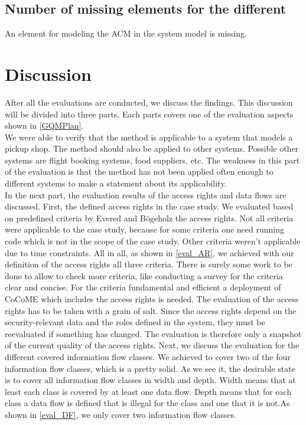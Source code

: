 \subsection{Number of missing elements for the different }
An element for modeling the ACM in the system model is missing.
\section{Discussion}
After all the evaluations are conducted, we discuss the findings. This discussion will be divided into three parts. Each parts covers one of the evaluation aspects shown in \autoref{GQMPlan}.\\
We were able to verify that the method is applicable to a system that models a pickup shop. The method should also be applied to other systems. Possible other systems are flight booking systems, food suppliers, etc. The weakness in this part of the evaluation is that the method has not been applied often enough to different systems to make a statement about its applicability.\\
In the next part, the evaluation results of the access rights and data flows are discussed. First, the defined access rights in the case study. We evaluated based on predefined criteria by Evered and Bögeholz \cite{CaseStudyAndAccessrigths} the access rights. Not all criteria were applicable to the case study, because for some criteria one need running code which is not in the scope of the case study. Other criteria weren't applicable due to time constraints. All in all, as shown in \autoref{eval_AR}, we achieved with our definition of the access rights all three criteria. There is surely some work to be done to allow to check more criteria, like conducting a survey for the criteria clear and concise. For the criteria fundamental and efficient a deployment of CoCoME which includes the access rights is needed. The evaluation of the access rights has to be taken with a grain of salt. Since the access rights depend on the security-relevant data and the roles defined in the system, they must be reevaluated if something has changed.  The evaluation is therefore only a snapshot of the current quality of the access rights. Next, we discuss the evaluation for the different covered information flow classes. We achieved to cover two of the four information flow classes, which is a pretty solid. As we see it, the desirable state is to cover all information flow classes in width and depth. Width means that at least each class is covered by at least one data flow. Depth means that for each class a data flow is defined that is illegal for the class and one that it is not.As shown in \autoref{eval_DF}, we only cover two information flow classes. 
